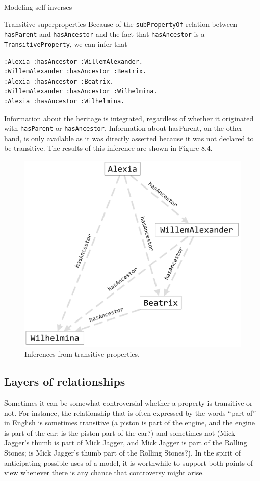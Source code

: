 \begin{challenge}{Modeling self-inverses}
\begin{challenge}{Transitive superproperties}
Because of the \texttt{subPropertyOf} relation between \texttt{hasParent} and \texttt{hasAncestor}
and the fact that
\texttt{hasAncestor} is a \texttt{TransitiveProperty}, we can infer that

\begin{lstlisting}
:Alexia :hasAncestor :WillemAlexander.
:WillemAlexander :hasAncestor :Beatrix.
:Alexia :hasAncestor :Beatrix.
:WillemAlexander :hasAncestor :Wilhelmina.
:Alexia :hasAncestor :Wilhelmina.
\end{lstlisting}

Information about the heritage is integrated, regardless of whether it
originated with \texttt{hasParent} or \texttt{hasAncestor}. Information about hasParent,
on the other hand, is only available as it was directly asserted because
it was not declared to be transitive. The results of this inference are
shown in Figure 8.4.
\end{challenge}

\begin{figure}
\centering
\includegraphics[width=5in]{SWWOv3/media/ch9/figure9-4.png}
\caption{Inferences from transitive properties.}
\label{fig:ch9.4}
\end{figure}



\subsection{Layers of relationships}

Sometimes it can be somewhat controversial whether a property is
transitive or not. For instance, the relationship that is often
expressed by the words ``part of'' in English is sometimes transitive (a
piston is part of the engine, and the engine is part of the car; is the
piston part of the car?) and sometimes not (Mick Jagger's thumb is part
of Mick Jagger, and Mick Jagger is part of the Rolling Stones; is Mick
Jagger's thumb part of the Rolling Stones?). In the spirit of
anticipating possible uses of a model, it is worthwhile to support both
points of view whenever there is any chance that controversy might
arise.


\end{challenge}
